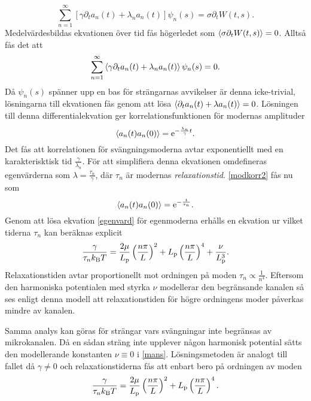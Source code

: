 \begin{equation}
    \sum_{n=1}^{\infty}\left[\gamma\partial_{t}a_{n}(t)+\lambda_{n} a_{n}(t)\right]\psi_{n}(s)=\sigma\partial_{t}W(t,s).
\end{equation}
Medelvärdesbildas ekvationen över tid fås högerledet som $\ev{\sigma\partial_{t}W(t,s)}=0$. Alltså fås det att
\begin{equation}
    \sum_{n=1}^{\infty}\ev{\gamma\partial_{t}a_{n}(t)+\lambda_{n}a_{n}(t)}\psi_{n}(s)=0.
\end{equation}
Då $\psi_{n}(s)$ spänner upp en bas för strängarnas avvikelser är denna icke-trivial, lösningarna till ekvationen fås genom att lösa $\ev{\partial_{t}a_{n}(t)+\lambda a_{n}(t)}=0$. Lösningen till denna differentialekvation ger korrelationsfunktionen för modernas amplituder
\begin{equation}
\label{modkorr2}
    \ev{a_{n}(t)a_{n}(0)}=\ee^{-\frac{\lambda_{n}}{\gamma}t}.
\end{equation}
Det fås att korrelationen för svängningsmoderna avtar exponentiellt med en karakterisktisk tid $\frac{\gamma}{\lambda_{n}}$. För att simplifiera denna ekvationen omdefineras egenvärderna som $\lambda=\frac{\tau_{n}}{\gamma}$, där $\tau_{n}$ är modernas \emph{relaxationstid}. \eqref{modkorr2} fås nu som
\begin{equation}\label{modkorr}
\ev{a_{n}(t)a_{n}(0)}=\ee^{-\frac{t}{\tau_{n}}}.
\end{equation}
Genom att lösa ekvation \eqref{egenvard} för egenmoderna erhålls en ekvation ur vilket tiderna $\tau_{n}$ kan beräknas explicit
\begin{equation}\label{relaxconf}
    \frac{\gamma}{\tau_{n}k_{\text{B}}T}=\frac{2\mu}{L_{\text{p}}}\left(\frac{n\pi}{L}\right)^{2}+L_{\text{p}}\left(\frac{n\pi}{L}\right)^{4}+\frac{\nu}{L_{\text{p}}^3}.
\end{equation}
Relaxationstiden avtar proportionellt mot ordningen på moden  $\tau_{n}\propto\frac{1}{n^4}$. Eftersom den harmoniska potentialen med styrka $\nu$ modellerar den begränsande kanalen så ses enligt denna modell att relaxationstiden för högre ordningens moder påverkas mindre av kanalen. 

Samma analys kan göras för strängar vars svängningar inte begränsas av mikrokanalen. Då en sådan sträng inte upplever någon harmonisk potential sätts den modellerande konstanten $\nu\equiv0$ i \eqref{mans}. Lösningsmetoden är analogt till fallet då $\gamma\neq0$ och relaxationstiderna fås att enbart bero på ordningen av moden 
\begin{equation}\label{relaxnonconf}
    \frac{\gamma}{\tau_{n}k_{\text{B}}T}=\frac{2\mu}{L_{\text{p}}}\left(\frac{n\pi}{L}\right)^{2}+L_{\text{p}}\left(\frac{n\pi}{L}\right)^{4}.
\end{equation}


